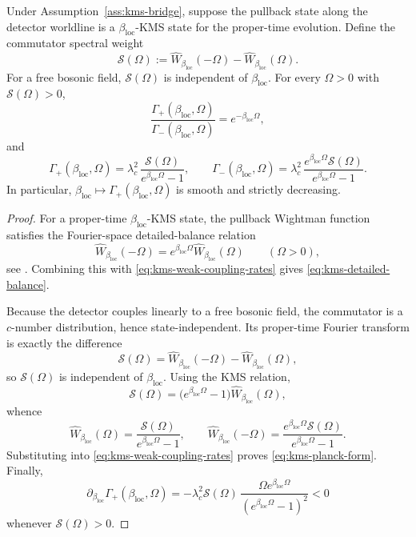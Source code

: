 \begin{proposition}\label{prop:kms-response}
Under Assumption~\ref{ass:kms-bridge}, suppose the pullback state along the detector worldline is a $\beta_{\mathrm{loc}}$-KMS state for the proper-time evolution. Define the commutator spectral weight
\begin{equation}\label{eq:kms-spectral-weight}
\mathcal S(\Omega)
:=
\widehat{W}_{\beta_{\mathrm{loc}}}(-\Omega)
-
\widehat{W}_{\beta_{\mathrm{loc}}}(\Omega).
\end{equation}
For a free bosonic field, $\mathcal S(\Omega)$ is independent of $\beta_{\mathrm{loc}}$. For every $\Omega>0$ with $\mathcal S(\Omega)>0$,
\begin{equation}\label{eq:kms-detailed-balance}
\frac{\Gamma_+(\beta_{\mathrm{loc}},\Omega)}{\Gamma_-(\beta_{\mathrm{loc}},\Omega)}
=
e^{-\beta_{\mathrm{loc}}\Omega},
\end{equation}
and
\begin{equation}\label{eq:kms-planck-form}
\Gamma_+(\beta_{\mathrm{loc}},\Omega)
=
\lambda_c^2\,
\frac{\mathcal S(\Omega)}{e^{\beta_{\mathrm{loc}}\Omega}-1},
\qquad
\Gamma_-(\beta_{\mathrm{loc}},\Omega)
=
\lambda_c^2\,
\frac{e^{\beta_{\mathrm{loc}}\Omega}\mathcal S(\Omega)}{e^{\beta_{\mathrm{loc}}\Omega}-1}.
\end{equation}
In particular, $\beta_{\mathrm{loc}}\mapsto \Gamma_+(\beta_{\mathrm{loc}},\Omega)$ is smooth and strictly decreasing.
\end{proposition}

\begin{proof}
For a proper-time $\beta_{\mathrm{loc}}$-KMS state, the pullback Wightman function satisfies the Fourier-space detailed-balance relation
\[
\widehat{W}_{\beta_{\mathrm{loc}}}(-\Omega)
=
e^{\beta_{\mathrm{loc}}\Omega}\widehat{W}_{\beta_{\mathrm{loc}}}(\Omega)
\qquad
(\Omega>0),
\]
see \cite{KayWald1991,BirDav1982}. Combining this with \eqref{eq:kms-weak-coupling-rates} gives \eqref{eq:kms-detailed-balance}.

Because the detector couples linearly to a free bosonic field, the commutator is a $c$-number distribution, hence state-independent. Its proper-time Fourier transform is exactly the difference
\[
\mathcal S(\Omega)
=
\widehat{W}_{\beta_{\mathrm{loc}}}(-\Omega)
-
\widehat{W}_{\beta_{\mathrm{loc}}}(\Omega),
\]
so $\mathcal S(\Omega)$ is independent of $\beta_{\mathrm{loc}}$. Using the KMS relation,
\[
\mathcal S(\Omega)
=
\bigl(e^{\beta_{\mathrm{loc}}\Omega}-1\bigr)\widehat{W}_{\beta_{\mathrm{loc}}}(\Omega),
\]
whence
\[
\widehat{W}_{\beta_{\mathrm{loc}}}(\Omega)
=
\frac{\mathcal S(\Omega)}{e^{\beta_{\mathrm{loc}}\Omega}-1},
\qquad
\widehat{W}_{\beta_{\mathrm{loc}}}(-\Omega)
=
\frac{e^{\beta_{\mathrm{loc}}\Omega}\mathcal S(\Omega)}{e^{\beta_{\mathrm{loc}}\Omega}-1}.
\]
Substituting into \eqref{eq:kms-weak-coupling-rates} proves \eqref{eq:kms-planck-form}. Finally,
\[
\partial_{\beta_{\mathrm{loc}}}\Gamma_+(\beta_{\mathrm{loc}},\Omega)
=
-\lambda_c^2\mathcal S(\Omega)\,
\frac{\Omega e^{\beta_{\mathrm{loc}}\Omega}}{(e^{\beta_{\mathrm{loc}}\Omega}-1)^2}
<0
\]
whenever $\mathcal S(\Omega)>0$.
\end{proof}

